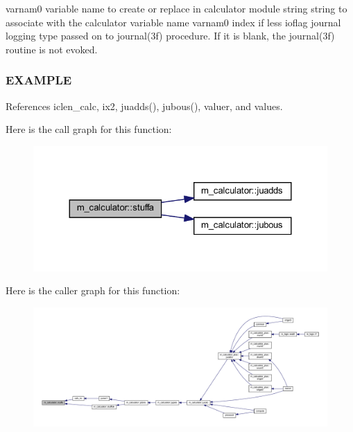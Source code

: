 varnam0 variable name to create or replace in calculator module string string to associate with the calculator variable name varnam0 index if less ioflag journal logging type passed on to journal(3f) procedure. If it is blank, the journal(3f) routine is not evoked. \subsubsection*{E\+X\+A\+M\+P\+LE}

References iclen\+\_\+calc, ix2, juadds(), jubous(), valuer, and values.

Here is the call graph for this function\+:
\nopagebreak
\begin{figure}[H]
\begin{center}
\leavevmode
\includegraphics[width=324pt]{namespacem__calculator_ade5ed0d5db38a14b2c521bc268756f39_cgraph}
\end{center}
\end{figure}
Here is the caller graph for this function\+:
\nopagebreak
\begin{figure}[H]
\begin{center}
\leavevmode
\includegraphics[width=350pt]{namespacem__calculator_ade5ed0d5db38a14b2c521bc268756f39_icgraph}
\end{center}
\end{figure}
\mbox{\label{namespacem__calculator_ae4cc2211f8bd276d5765e4ebc9d6e354}} 
